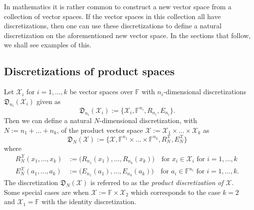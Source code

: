 \documentclass[a4paper]{paper}
\newcommand{\discr}{\mathfrak{D}}
\newcommand{\VecSpace}[1]{\mathscr{#1}}
\newcommand{\Field}{\mathbb{F}}
\begin{document}
In mathematics it is rather common to construct a new vector space from a collection of vector spaces. If the 
vector spaces in this collection all have discretizations, then one can use these discretizations to 
define a natural discretization on the aforementioned new vector space. In the sections that follow, we shall see
examples of this.

\subsection{Discretizations of product spaces}
Let $\VecSpace{X}_i$ for $i=1,\ldots,k$ be vector spaces over $\Field$ with $n_i$-dimensional 
discretizations $\discr_{n_i}(\VecSpace{X}_i)$ given as 
\[
     \discr_{n_i}(\VecSpace{X}_i) := \bigl\{ \VecSpace{X}_i,\Field^{n_i},R_{n_i},E_{n_i} \bigr\}. 
\]
Then we can define a natural $N$-dimensional discretization, with $N:=n_1+\ldots+n_k$, of the product vector space 
$\VecSpace{X} := \VecSpace{X}_1 \times \ldots \times \VecSpace{X}_k$ as 
\[ \discr_{N}(\VecSpace{X}):=\{\VecSpace{X},\Field^{n_1}  \times \ldots \times \Field^{n_k},R_{N}^{\VecSpace{X}},E_{N}^{\VecSpace{X}} \} \]
where
\begin{align*}
   R_{N}^{\VecSpace{X}}(x_1,\ldots,x_k) &:= \bigl( R_{n_1}(x_1),\ldots,R_{n_k}(x_k) \bigr)
      \quad\text{for $x_i\in \VecSpace{X}_i$ for $i=1,\ldots,k$} \\
   E_{N}^{\VecSpace{X}}(a_1,\ldots,a_k)  &:=  \bigl( E_{n_1}(a_1),\ldots,E_{n_k}(a_k) \bigr) 
     \quad\text{for $a_i \in \Field^{n_i}$ for $i=1,\ldots,k$.}
\end{align*}
The discretization 
$ \discr_{N}(\VecSpace{X})$ is referred to as the \emph{product discretization of $\VecSpace{X}$}. Some special cases are 
when $\VecSpace{X}:=\Field \times \VecSpace{X}_2$ which corresponds to the case $k=2$ and $\VecSpace{X}_1=\Field$ with the 
identity discretization.
\end{document}
